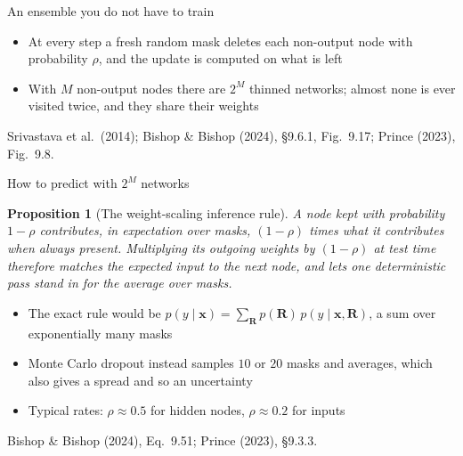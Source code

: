 \documentclass[aspectratio=169, 11pt]{beamer}
\newtheorem{propx}[theorem]{Proposition}
\newcommand{\srcline}[1]{%
  \par\vspace{0.25em}%
  {\scriptsize\color{mcMuted}\hfill #1\par}}
\begin{document}
\begin{frame}{An ensemble you do not have to train}
\begin{center}
  \end{center}
  \vspace{-0.15em}
  \begin{itemize}\itemsep0.24em
    \item At every step a fresh random mask deletes each non-output node
          with probability $\rho$, and the update is computed on what is
          left
    \item With $M$ non-output nodes there are $2^{M}$ thinned networks;
          almost none is ever visited twice, and they \alert{share} their
          weights
  \end{itemize}
  \srcline{Srivastava et al.\ (2014); Bishop \& Bishop (2024), \S9.6.1,
  Fig.~9.17; Prince (2023), Fig.~9.8.}
\end{frame}

\begin{frame}{How to predict with $2^M$ networks}
  \vspace{-0.2em}
  \begin{propx}[The weight-scaling inference rule]\label{th:wsr}
    \small
    A node kept with probability $1-\rho$ contributes, in expectation
    over masks, $(1-\rho)$ times what it contributes when always
    present. Multiplying its outgoing weights by $(1-\rho)$ at test time
    therefore matches the expected input to the next node, and lets one
    deterministic pass stand in for the average over masks.
  \end{propx}
  \vspace{0.1em}
  {\footnotesize
  \begin{itemize}\itemsep0.22em
    \item The exact rule would be
          $p(y\mid\mathbf{x}) = \sum_{\mathbf{R}} p(\mathbf{R})\,p(y\mid\mathbf{x},\mathbf{R})$,
          a sum over exponentially many masks
    \item \alert{Monte Carlo dropout} instead samples $10$ or $20$ masks
          and averages, which also gives a spread and so an uncertainty
    \item Typical rates: $\rho \approx 0.5$ for hidden nodes,
          $\rho \approx 0.2$ for inputs
  \end{itemize}}
  \srcline{Bishop \& Bishop (2024), Eq.~9.51; Prince (2023), \S9.3.3.}
\end{frame}
\end{document}
